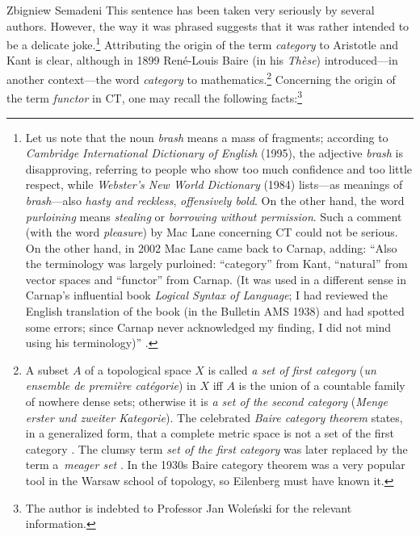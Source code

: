 \begin{artengenv}{Zbigniew Semadeni}
\noindent This sentence has been taken very seriously by several authors. However, 
the way it was phrased suggests that it was rather intended to be a delicate 
joke.\footnote{ Let us note that the noun \textit{brash} means a mass of fragments; 
according to \textit{Cambridge International Dictionary of English} (1995), the 
adjective \textit{brash} is disapproving, referring to people who show too much 
confidence and too little respect, while \textit{Webster's New World Dictionary} 
(1984) lists---as meanings of \textit{brash}---also \textit{hasty and reckless}, 
\textit{offensively bold}. On the other hand, the word \textit{purloining} means 
\textit{stealing} or \textit{borrowing without permission}. Such a comment (with 
the word \textit{pleasure}) by Mac Lane concerning CT could not be serious. On the 
other hand, in 2002 Mac Lane came back to Carnap, adding: 
``Also the terminology was largely purloined: “category” from Kant, “natural” 
from vector spaces and “functor” from Carnap. (It was used in a different sense in 
Carnap’s influential book \textit{Logical Syntax of Language}; I had reviewed the English 
translation of the book (in the Bulletin AMS 1938) and had spotted some errors; 
since Carnap never acknowledged my finding, I did not mind using his 
terminology)'' %
\parencite[pp.130--131]{MLonE}.} %
Attributing the origin of the term \textit{category} to Aristotle and Kant is clear, 
although in 1899 Ren\'e-Louis Baire (in his \textit{Th\`ese}) introduced---in 
another context---the word \textit{category} to 
mathematics.\footnote{ A subset $A$ of a topological space $X$ is called \textit{a 
set of first category} (\textit{un ensemble de pre\-mi\`ere cat\'e\-gorie}) in $X$ 
iff $A$ is the union of a countable family of nowhere dense sets; otherwise it is 
\textit{a set of the second category} (\textit{Menge erster und zweiter Kategorie}). 
The celebrated \textit{Baire category theorem} states, in a generalized form, 
that a complete metric space is not a set 
of the first category \parencites[][p.328]{Hausdorff}[][\S~10]{Kuratowski}. The 
clumsy term \textit{set of the first category} was later replaced by the term 
a~\textit{meager set} \parencite[p.201]{Kelley}. In the 1930s Baire category theorem 
was a very popular tool in the Warsaw school of topology, so Eilenberg must have 
known it.} %
Concerning the origin of the term \textit{functor} in CT, one may recall the 
following facts:\footnote{ The author is indebted to Professor Jan Wole\'nski 
for the relevant information.} 


\end{artengenv}
